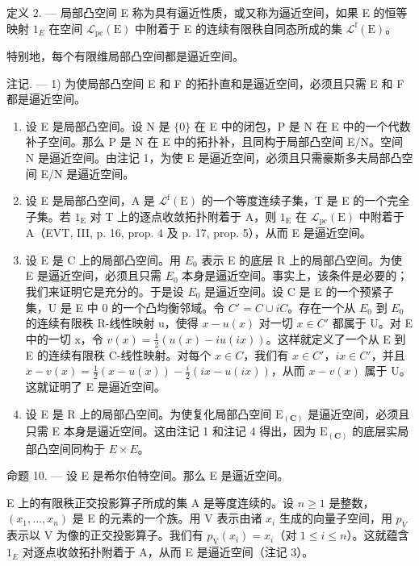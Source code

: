 定义 2. --- 局部凸空间 E 称为具有逼近性质，或又称为逼近空间，如果 E 的恒等映射 \(1_{E}\) 在空间 \(\mathcal{L}_{\mathrm{pc}}(\mathrm{E})\) 中附着于 E 的连续有限秩自同态所成的集 \(\mathcal{L}^{\mathrm{f}}(\mathrm{E})\)。

特别地，每个有限维局部凸空间都是逼近空间。

注记. --- 1) 为使局部凸空间 E 和 F 的拓扑直和是逼近空间，必须且只需 E 和 F 都是逼近空间。

\begin{enumerate}
\def\labelenumi{\arabic{enumi})}
\setcounter{enumi}{1}
\item
  设 E 是局部凸空间。设 N 是 \(\{0\}\) 在 E 中的闭包，P 是 N 在 E 中的一个代数补子空间。那么 P 是 N 在 E 中的拓扑补，且同构于局部凸空间 E/N。空间 N 是逼近空间。由注记 1，为使 E 是逼近空间，必须且只需豪斯多夫局部凸空间 E/N 是逼近空间。
\item
  设 E 是局部凸空间，A 是 \(\mathcal{L}^{\mathrm{f}}(\mathrm{E})\) 的一个等度连续子集，T 是 E 的一个完全子集。若 \(1_{\mathrm{E}}\) 对 T 上的逐点收敛拓扑附着于 A，则 \(1_{\mathrm{E}}\) 在 \(\mathcal{L}_{\mathrm{pc}}(\mathrm{E})\) 中附着于 A（EVT, III, p. 16, prop. 4 及 p. 17, prop. 5），从而 E 是逼近空间。
\item
  设 E 是 C 上的局部凸空间。用 \(E_{0}\) 表示 E 的底层 R 上的局部凸空间。为使 E 是逼近空间，必须且只需 \(E_{0}\) 本身是逼近空间。事实上，该条件是必要的；我们来证明它是充分的。于是设 \(E_{0}\) 是逼近空间。设 C 是 E 的一个预紧子集，U 是 E 中 0 的一个凸均衡邻域。令 \(C' = C \cup iC\)。存在一个从 \(E_{0}\) 到 \(E_{0}\) 的连续有限秩 R-线性映射 u，使得 \(x - u(x)\) 对一切 \(x \in C'\) 都属于 U。对 E 中的一切 x，令 \(v(x) = \frac{1}{2}(u(x) - iu(ix))\)。这样就定义了一个从 E 到 E 的连续有限秩 C-线性映射。对每个 \(x \in C\)，我们有 \(x \in C'\)，\(ix \in C'\)，并且 \(x - v(x) = \frac{1}{2}(x - u(x)) - \frac{i}{2}(ix - u(ix))\)，从而 \(x - v(x)\) 属于 U。这就证明了 E 是逼近空间。
\item
  设 E 是 R 上的局部凸空间。为使复化局部凸空间 \(\mathrm{E}_{(\mathbf{C})}\) 是逼近空间，必须且只需 E 本身是逼近空间。这由注记 1 和注记 4 得出，因为 \(\mathrm{E}_{(\mathbf{C})}\) 的底层实局部凸空间同构于 \(E \times E\)。
\end{enumerate}

命题 10. --- 设 E 是希尔伯特空间。那么 E 是逼近空间。

E 上的有限秩正交投影算子所成的集 A 是等度连续的。设 \(n \geqslant 1\) 是整数，\((x_{1}, \ldots, x_{n})\) 是 E 的元素的一个族。用 V 表示由诸 \(x_{i}\) 生成的向量子空间，用 \(p_{V}\) 表示以 V 为像的正交投影算子。我们有 \(p_{\mathrm{V}}(x_{i}) = x_{i}\)（对 \(1 \leqslant i \leqslant n\)）。这就蕴含 \(1_{E}\) 对逐点收敛拓扑附着于 A，从而 E 是逼近空间（注记 3）。

